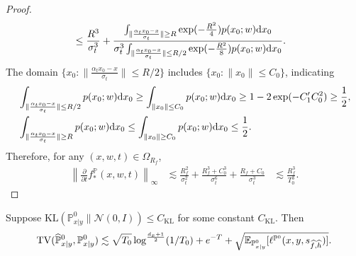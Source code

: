 \documentclass[11pt]{article}
\numberwithin{equation}{section}
\renewcommand{\P}{\mathbb{P}}
\begin{document}
\begin{proof}
\begin{equation}
\begin{aligned}
            &\leq \frac{R^3}{\sigma_t^3} + \frac{\int_{\|\frac{\alpha_tx_0-x}{\sigma_t}\|\geq R} \exp(-\frac{R^2}{4})p(x_0;w)\mathrm{d} x_0}{\sigma_t^3\int_{\|\frac{\alpha_tx_0-x}{\sigma_t}\|\leq R/2} \exp(-\frac{R^2}{8})p(x_0;w)\mathrm{d} x_0}.
        \end{aligned}
    \end{equation}
    The domain $\Big\{x_0:\|\frac{\alpha_tx_0-x}{\sigma_t}\|\leq R/2\Big\}$ includes $\Big\{x_0:\|x_0\|\leq C_0\Big\}$, indicating
    \begin{equation}
        \begin{aligned}
            &\int_{\|\frac{\alpha_tx_0-x}{\sigma_t}\|\leq R/2} p(x_0;w)\mathrm{d} x_0\geq  \int_{\|x_0\|\leq C_0} p(x_0;w)\mathrm{d} x_0 \geq 1-2\exp(-C_1'C_0^2)\geq \frac{1}{2},\\
            &\int_{\|\frac{\alpha_tx_0-x}{\sigma_t}\|\geq R} p(x_0;w)\mathrm{d} x_0\leq  \int_{\|x_0\|\geq C_0} p(x_0;w)\mathrm{d} x_0 \leq \frac{1}{2}.
        \end{aligned}
    \end{equation}
    Therefore, for any $(x,w,t)\in\Omega_{R_f}$,
    \begin{equation}
        \begin{aligned}
            \left\|\frac{\partial}{\partial t}f_*^\P(x,w,t)\right\|_\infty
            &\lesssim \frac{R_f^2}{\sigma_t^2}+\frac{R_f^3+C_0^3}{\sigma_t^6}+\frac{R_f+C_0}{\sigma_t^3}
            &\lesssim \frac{R_f^3}{T_0^3}.
        \end{aligned}
    \end{equation}
\end{proof}


\begin{lemma}\label{lem:TV_bound}
    Suppose $\mathrm{KL}(\P^0_{x|y}\|\mathcal{N}(0,I))\leq C_{\mathrm{KL}}$ for some constant $C_{\mathrm{KL}}$. Then
    \begin{equation}
        \mathrm{TV}(\widehat{\P}^0_{x|y},\P^0_{x|y})\lesssim \sqrt{T_0}\log^{\frac{d_x+1}{2}}(1/T_0) + e^{-T} + \sqrt{\E_{\P^0_{x|y}}[\ell^{\P^0}(x,y,s_{\widehat{f},\widehat{h}})]}.
    \end{equation}
\end{lemma}
\end{document}
